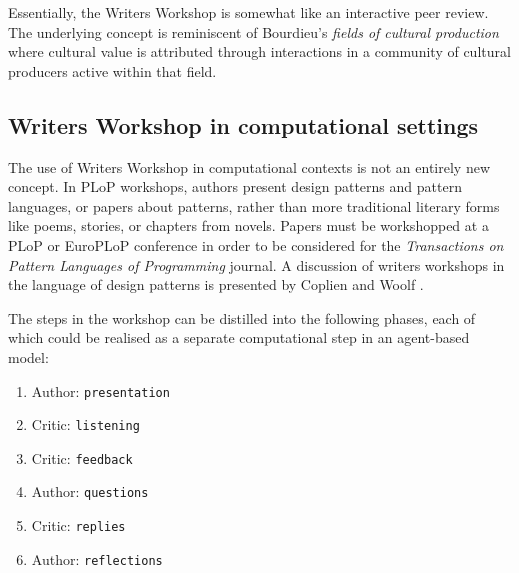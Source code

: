 Essentially, the Writers Workshop is somewhat like an interactive peer review. The underlying concept is reminiscent of Bourdieu's {\em fields of cultural production} \cite{bourdieu93} where cultural value is attributed through interactions in a community of cultural producers active within that field. 

\subsection{Writers Workshop in computational settings}
The use of Writers Workshop in computational contexts is not an
entirely new concept. In PLoP workshops, authors present design
patterns and pattern languages, or papers about patterns, rather than
more traditional literary forms like poems, stories, or chapters from
novels.  Papers must be workshopped at a PLoP or EuroPLoP conference
in order to be considered for the \emph{Transactions on Pattern
  Languages of Programming} journal.  A discussion of writers
workshops in the language of design patterns is presented by Coplien
and Woolf \citeyear{coplien1997pattern}. %
%

The steps in the workshop can be distilled into the following phases,
each of which could be realised as a separate computational step in an
agent-based model:
\begin{center}
\begin{fminipage}{.53\columnwidth}
\begin{enumerate}[itemsep=0pt]
\item Author: {\tt presentation}
\item Critic: {\tt listening}
\item Critic: {\tt feedback}
\item Author: {\tt questions}
\item Critic: {\tt replies}
\item Author: {\tt reflections}
\end{enumerate}
\end{fminipage}
\end{center}

